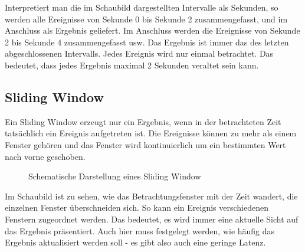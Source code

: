 \documentclass[a4paper,11pt]{scrartcl}
\begin{document}
  Interpretiert man die im Schaubild dargestellten Intervalle als
  Sekunden, so werden alle Ereignisse von Sekunde 0 bis Sekunde 2
  zusammengefasst, und im Anschluss als Ergebnis geliefert. Im
  Anschluss werden die Ereignisse von Sekunde 2 bis Sekunde 4
  zusammengefasst usw. Das Ergebnis ist immer das des letzten
  abgeschlossenen Intervalls. Jedes Ereignis wird nur einmal
  betrachtet. Das bedeutet, dass jedes Ergebnis maximal 2 Sekunden
  veraltet sein kann.

  \subsection{Sliding Window}
  Ein Sliding Window erzeugt nur ein Ergebnis, wenn in der
  betrachteten Zeit tatsächlich ein Ereignis aufgetreten ist. Die
  Ereignisse können zu mehr als einem Fenster gehören und das Fenster
  wird kontinuierlich um ein bestimmten Wert nach vorne
  geschoben.\cite[S.~472]{kleppmann17}
  \begin{figure}[!h]
    \centering
    \caption{Schematische Darstellung eines Sliding Window}
  \end{figure}

  Im Schaubild ist zu sehen, wie das Betrachtungsfenster mit der Zeit
  wandert, die einzelnen Fenster überschneiden sich. So kann ein
  Ereignis verschiedenen Fenstern zugeordnet werden. Das bedeutet, es
  wird immer eine aktuelle Sicht auf das Ergebnis präsentiert. Auch
  hier muss festgelegt werden, wie häufig das Ergebnis aktualisiert
  werden soll - es gibt also auch eine geringe Latenz.



\end{document}
